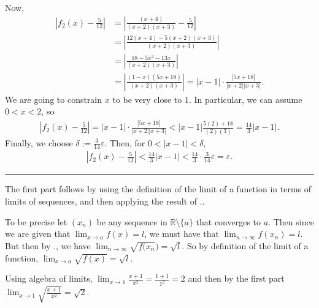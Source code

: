 \documentclass[letterpaper,10pt,english]{jupyterBook}
\begin{document}
\sphinxAtStartPar
Now,
\begin{align*}
\left|f_2(x)-\frac{5}{12}\right| &= \left|\frac{(x + 4)}{(x + 2)(x + 3)}-\frac{5}{12}\right| \\
&= \left|\frac{12(x+4)-5(x+2)(x+3)}{(x+2)(x+3)}\right| \\
&= \left|\frac{18-5x^2-13x}{(x+2)(x+3)}\right| \\
&= \left|\frac{(1-x)(5x+18)}{(x+2)(x+3)}\right|  = |x-1|\cdot\frac{|5x+18|}{|x+2||x+3|}.
\end{align*}
\sphinxAtStartPar
We are going to constrain \(x\) to be very close to \(1\). In particular, we can assume \(0<x<2\), so
\begin{equation*}
\begin{split}
\left|f_2(x)-\frac{5}{12}\right| =|x-1|\cdot\frac{|5x+18|}{|x+2||x+3|} < |x-1| \frac{5(2)+18}{(2)(3)} = \frac{14}{3}|x-1|.
\end{split}
\end{equation*}
\sphinxAtStartPar
Finally, we choose \(\delta:= \frac{3}{14}\varepsilon\). Then, for \(0<|x-1|< \delta\),
\begin{equation*}
\begin{split}
\left|f_2(x)-\frac{5}{12}\right| <  \frac{14}{3}|x-1| <  \frac{14}{3}\cdot \frac{3}{14}\varepsilon = \varepsilon.
\end{split}
\end{equation*}

\bigskip\hrule\bigskip


\sphinxAtStartPar
{\hyperref[\detokenize{Problems:id5}]{}} The first part follows by using the definition of the limit of a function in terms of limits of sequences, and then applying the result of {\hyperref[\detokenize{Problems:p4}]{}}..

To be precise let \((x_{n})\) be any sequence in \(\mathbb{R} \setminus \{a\}\) that converges to \(a\). Then since we are given that \(\lim_{x \rightarrow a} f(x) = l\), we must have that \(\lim_{n\rightarrow\infty} f(x_{n}) = l\). But then by {\hyperref[\detokenize{Problems:p4}]{}}., we have \(\lim_{n\rightarrow\infty} \sqrt{f(x_{n}}) = \sqrt{l}\). So by definition of the limit of a function, \(\lim_{x \rightarrow a} \sqrt{f(x)} = \sqrt{l}\).

Using algebra of limits,  \(\lim_{x \rightarrow 1}\displaystyle\frac{x+1}{x^{2}}=\frac{1+1}{1^2}=2\) and
then by the first part \(\lim_{x \rightarrow 1}\sqrt{\displaystyle\frac{x+1}{x^{2}}} = \sqrt{2}\).
\end{document}
